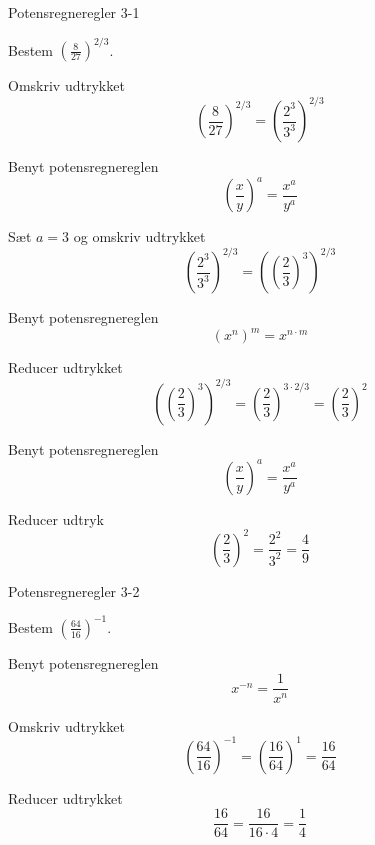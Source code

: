 \documentclass{article}
\begin{document}
\tableofcontents
\newpage

\begin{exercise}{Potensregneregler 3-1}

Bestem $\left(\frac{8}{27}\right)^{2/3}$.


\hint

Omskriv udtrykket
\[
\left(\frac{8}{27}\right)^{2/3} = \left(\frac{2^3}{3^3}\right)^{2/3}
\]

\hint

Benyt potensregnereglen
\[
\left(\frac{x}{y}\right)^a = \frac{x^a}{y^a}
\]

\hint

Sæt $a=3$ og omskriv udtrykket
\[
\left(\frac{2^3}{3^3}\right)^{2/3} = {\left( \left( \frac{2}{3} \right)^3 \right)}^{2/3}
\]

\hint

Benyt potensregnereglen
\[
(x^n)^m = x^{n \cdot m}
\]

\hint

Reducer udtrykket
\[
{\left( \left( \frac{2}{3} \right)^3 \right)}^{2/3} = {\left( \frac{2}{3} \right)}^{ 3 \cdot 2/3} = {\left(\frac{2}{3}\right)}^2
\]

\hint

Benyt potensregnereglen
\[
\left(\frac{x}{y}\right)^a = \frac{x^a}{y^a}
\]

\hint

Reducer udtryk
\[
{\left(\frac{2}{3}\right)}^2 = \frac{2^2}{3^2} = \frac{4}{9}
 \]


\end{exercise}

\newpage

\begin{exercise}{Potensregneregler 3-2}

Bestem $\left(\frac{64}{16}\right)^{-1}$.



\hint

Benyt potensregnereglen
\[
x^{-n} = \frac{1}{x^n}
\]

\hint
Omskriv udtrykket
\[
\left(\frac{64}{16}\right)^{-1} = \left(\frac{16}{64}\right)^1 = \frac{16}{64}
\]

\hint

Reducer udtrykket
\[
\frac{16}{64} = \frac{16}{16 \cdot 4} = \frac{1}{4}
\]



\end{exercise}
\end{document}
